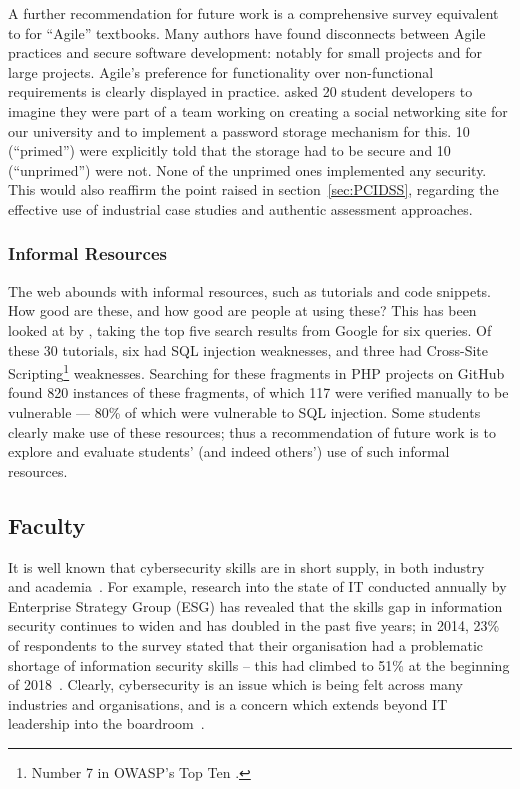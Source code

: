 \documentclass[conference]{IEEEtran}
\begin{document}
{A further recommendation for future work is a comprehensive survey equivalent to \cite{Drop2019} for ``Agile'' textbooks. Many authors have found disconnects between Agile practices and secure software development: notably \cite{Bartsch2011a} for small projects and \cite{vanderHeijden:2018:EPS:3239235.3267426} for large projects. Agile's preference for functionality over non-functional requirements is clearly displayed in practice. \cite{Naiakshinaetal2017a} asked 20 student developers to imagine they were part of a team working on creating a social networking site for our university and to implement a password storage mechanism for this. 10 (``primed'') were explicitly told that the storage had to be secure and 10 (``unprimed'') were not. None of the unprimed ones implemented any security. This would also reaffirm the point raised in section~\ref{sec:PCIDSS}, regarding the effective use of industrial case studies and authentic assessment approaches.

\subsubsection{Informal Resources}\label{sec:informal}

The web abounds with informal resources, such as tutorials and code snippets. How good are these, and how good are people at using these? This has been looked at by \cite{Unruhetal2017a}, taking the top five search results from Google for six queries. Of these 30 tutorials, six had SQL injection weaknesses, and three had Cross-Site Scripting\footnote{Number 7 in OWASP's Top Ten \cite{OWASP2017a}.} weaknesses. Searching for these fragments in PHP projects on GitHub found 820 instances of these fragments, of which 117 were verified manually to be vulnerable --- 80\% of which were vulnerable to SQL injection. Some students clearly make use of these resources; thus a recommendation of future work is to explore and evaluate students' (and indeed others') use of such informal resources. 

\subsection{Faculty}

It is well known that cybersecurity skills are in short supply, in both industry~\cite{Ackerman2019a} and academia~\cite{schneider2013}. For example, research into the state of IT conducted annually by Enterprise Strategy Group (ESG) has revealed that the skills gap in information security continues to widen and has doubled in the past five years; in 2014, 23\% of respondents to the survey stated that their organisation had a problematic shortage of information security skills -- this had climbed to 51\% at the beginning of 2018~\cite{ESG:2018}. Clearly, cybersecurity is an issue which is being felt across many industries and organisations, and is a concern which extends beyond IT leadership into the boardroom~\cite{Ackerman2019a}.

}
\end{document}
